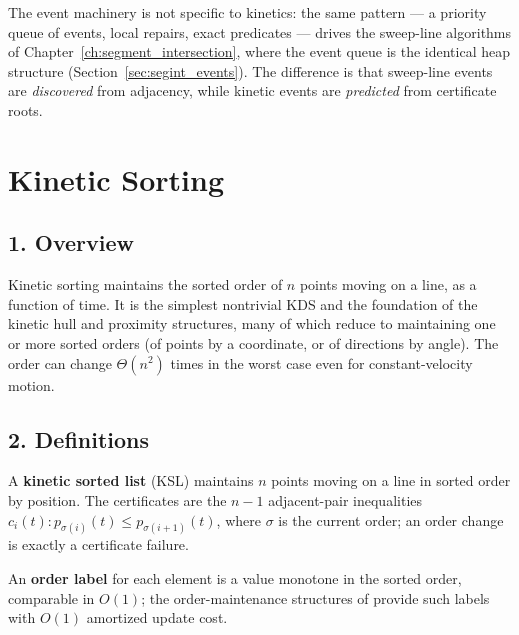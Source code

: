 \begin{remark}
  The event machinery is not specific to kinetics: the same pattern --- a
  priority queue of events, local repairs, exact predicates --- drives the
  sweep-line algorithms of Chapter~\ref{ch:segment_intersection}, where the
  event queue is the identical heap structure (Section~\ref{sec:segint_events}).
  The difference is that sweep-line events are \emph{discovered} from
  adjacency, while kinetic events are \emph{predicted} from certificate
  roots.
\end{remark}


\section{Kinetic Sorting}
\label{sec:dynamic_kinetic_sorting}

\subsection{1. Overview}

Kinetic sorting maintains the sorted order of $n$ points moving on a line,
as a function of time. It is the simplest nontrivial KDS and the foundation
of the kinetic hull and proximity structures, many of which reduce to
maintaining one or more sorted orders (of points by a coordinate, or of
directions by angle). The order can change $\Theta(n^2)$ times in the worst
case even for constant-velocity motion.

\subsection{2. Definitions}

\begin{definition}\label{def:kinetic_sorted_list}
  A \textbf{kinetic sorted list} (KSL) maintains $n$ points moving on a line
  in sorted order by position. The certificates are the $n-1$ adjacent-pair
  inequalities $c_i(t) : p_{\sigma(i)}(t) \le p_{\sigma(i+1)}(t)$, where
  $\sigma$ is the current order; an order change is exactly a certificate
  failure.
\end{definition}

\begin{definition}\label{def:kinetic_order_label}
  An \textbf{order label} for each element is a value monotone in the sorted
  order, comparable in $O(1)$; the order-maintenance structures of
  \cite{dietzsleator1987} provide such labels with $O(1)$ amortized update
  cost.
\end{definition}


